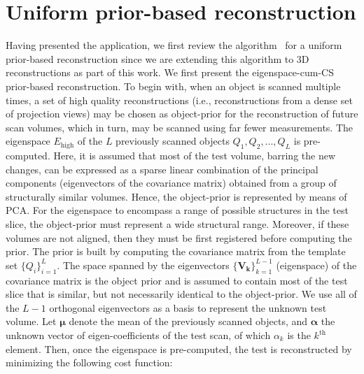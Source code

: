 \documentclass[journal]{IEEEtran}
\begin{document}
\section{Uniform prior-based reconstruction}
\label{sec:method_uniform_prior}
Having presented the application, we first review the algorithm~\cite{my_dicta_paper} for a uniform  prior-based reconstruction since we are extending this algorithm to 3D reconstructions as part of this work.
We first present the eigenspace-cum-CS prior-based reconstruction. To begin with, when an object is scanned multiple times, a set of high quality reconstructions (i.e., reconstructions from a dense set of projection views) may be chosen as object-prior for the reconstruction of future scan volumes, which in turn, may be scanned using far fewer measurements. The eigenspace $E_{\text{high}}$ of the $L$ previously scanned objects $Q_1,Q_2,...,Q_L$ is pre-computed. Here, it is assumed that most of the test volume, barring the new changes, can be expressed as a sparse linear combination of the principal components (eigenvectors of the covariance matrix) obtained from a group of structurally similar volumes. Hence, the object-prior is represented by means of PCA. For the eigenspace to encompass a range of possible structures in the test slice, the object-prior must represent a wide structural range. Moreover, if these volumes are not aligned, then they must be first registered before computing the prior. The prior is built by computing the covariance matrix from the template set $\{Q_i\}_{i=1}^L$. The space spanned by the eigenvectors $\{\boldsymbol{V_k}\}_{k=1}^{L-1}$ (eigenspace) of the covariance matrix is the object prior and is assumed to contain most of the test slice that is similar, but not necessarily identical to the object-prior. We use all of the $L-1$ orthogonal eigenvectors as a basis to represent the unknown test volume. Let $\boldsymbol{\mu}$ denote the mean of the previously scanned objects, and $\boldsymbol{\alpha}$ the unknown vector of eigen-coefficients of the test scan, of which $\alpha_k$ is the $k^{\textrm{th}}$ element. Then, once the eigenspace is pre-computed, the test is reconstructed by minimizing the following cost function:
\end{document}
